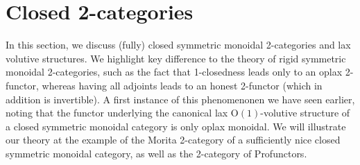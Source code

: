 \documentclass{article}
\newcommand{\Oone}{\operatorname{O(1)}}
\numberwithin{equation}{section}
\theoremstyle{definition}
\theoremstyle{theorem}
\begin{document}
\section{Closed 2-categories}\label{Section: Closed 2-categories}
In this section, we discuss (fully) closed symmetric monoidal 2-categories and lax volutive structures. We highlight key difference to the theory 
of rigid symmetric monoidal 2-categories, such as the fact that 1-closedness leads only to an oplax 2-functor, whereas having all adjoints leads to an honest 
2-functor (which in addition is invertible). A first instance of this phenomenonen we have seen earlier, noting that the functor underlying the canonical 
lax $\Oone$-volutive structure of a closed symmetric monoidal category is only oplax monoidal. We will illustrate our theory at the example of the Morita 2-category 
of a sufficiently nice closed symmetric monoidal category, as well as the 2-category of Profunctors.
\end{document}
